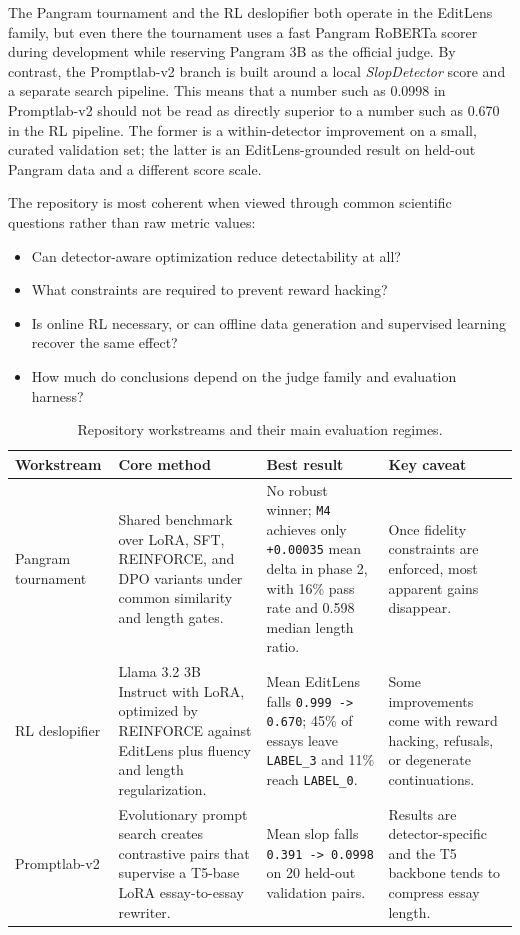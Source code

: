 \documentclass[11pt]{article}
\begin{document}
The Pangram tournament and the RL deslopifier both operate in the EditLens family, but even there the tournament uses a fast Pangram RoBERTa scorer during development while reserving Pangram 3B as the official judge. By contrast, the Promptlab-v2 branch is built around a local \emph{SlopDetector} score and a separate search pipeline. This means that a number such as 0.0998 in Promptlab-v2 should not be read as directly superior to a number such as 0.670 in the RL pipeline. The former is a within-detector improvement on a small, curated validation set; the latter is an EditLens-grounded result on held-out Pangram data and a different score scale.

The repository is most coherent when viewed through common scientific questions rather than raw metric values:

\begin{itemize}[leftmargin=1.2em]
\item Can detector-aware optimization reduce detectability at all?
\item What constraints are required to prevent reward hacking?
\item Is online RL necessary, or can offline data generation and supervised learning recover the same effect?
\item How much do conclusions depend on the judge family and evaluation harness?
\end{itemize}

\begin{table}[t]
\centering
\small
\setlength{\tabcolsep}{5pt}
\begin{tabularx}{\linewidth}{l Y Y Y}
\toprule
Workstream & Core method & Best result & Key caveat \\
\midrule
Pangram tournament & Shared benchmark over LoRA, SFT, REINFORCE, and DPO variants under common similarity and length gates. & No robust winner; \texttt{M4} achieves only \texttt{+0.00035} mean delta in phase 2, with 16\% pass rate and 0.598 median length ratio. & Once fidelity constraints are enforced, most apparent gains disappear. \\
RL deslopifier & Llama 3.2 3B Instruct with LoRA, optimized by REINFORCE against EditLens plus fluency and length regularization. & Mean EditLens falls \texttt{0.999 -> 0.670}; 45\% of essays leave \texttt{LABEL\_3} and 11\% reach \texttt{LABEL\_0}. & Some improvements come with reward hacking, refusals, or degenerate continuations. \\
Promptlab-v2 & Evolutionary prompt search creates contrastive pairs that supervise a T5-base LoRA essay-to-essay rewriter. & Mean slop falls \texttt{0.391 -> 0.0998} on 20 held-out validation pairs. & Results are detector-specific and the T5 backbone tends to compress essay length. \\
\bottomrule
\end{tabularx}
\caption{Repository workstreams and their main evaluation regimes.}
\end{table}
\end{document}
